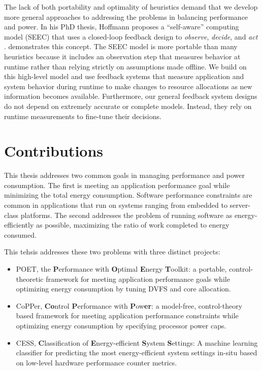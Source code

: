 The lack of both portability and optimality of heuristics demand that we develop more general approaches to addressing the problems in balancing performance and power.
In his PhD thesis, Hoffmann proposes a ``self-aware'' computing model (SEEC) that uses a closed-loop feedback design to \emph{observe}, \emph{decide}, and \emph{act} \cite{HoffmannPhD}.
 demonstrates this concept.
The SEEC model is more portable than many heuristics because it includes an observation step that measures behavior at runtime rather than relying strictly on assumptions made offline.
We build on this high-level model and use feedback systems that measure application and system behavior during runtime to make changes to resource allocations as new information becomes available.
Furthermore, our general feedback system designs do not depend on extremely accurate or complete models.
Instead, they rely on runtime measurements to fine-tune their decisions.


\section{Contributions}

This thesis addresses two common goals in managing performance and power consumption.
The first is meeting an application performance goal while minimizing the total energy consumption.
Software performance constraints are common in applications that run on systems ranging from embedded to server-class platforms.
The second addresses the problem of running software as energy-efficiently as possible, \ie maximizing the ratio of work completed to energy consumed.

This tehsis addresses these two problems with three distinct projects:
\begin{itemize}
\item POET, the \textbf{P}erformance with \textbf{O}ptimal \textbf{E}nergy \textbf{T}oolkit: a portable, control-theoretic framework for meeting application performance goals while optimizing energy consumption by tuning DVFS and core allocation.
\item CoPPer, \textbf{Co}ntrol \textbf{P}erformance with \textbf{P}ow\textbf{er}: a model-free, control-theory based framework for meeting application performance constraints while optimizing energy consumption by specifying processor power caps.
\item CESS, \textbf{C}lassification of \textbf{E}nergy-efficient \textbf{S}ystem \textbf{S}ettings: A machine learning classifier for predicting the most energy-efficient system settings in-situ based on low-level hardware performance counter metrics.
\end{itemize}


